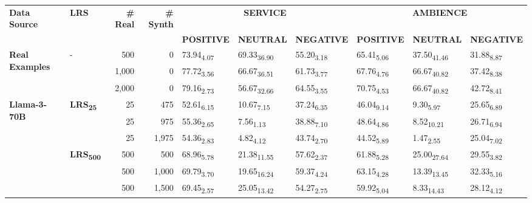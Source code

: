 \begin{table}[H]
\begin{subtable}{\linewidth}
{\begin{tabular}{llrrllllll}
\hline
\textbf{Data Source} & \textbf{LRS} & \textbf{\# Real} & \textbf{\# Synth} & \multicolumn{3}{c}{\textbf{SERVICE}} & \multicolumn{3}{c}{\textbf{AMBIENCE}}                        \\
                     &              &                 &                  & \textbf{POSITIVE}             & \textbf{NEUTRAL}            & \textbf{NEGATIVE}            & \textbf{POSITIVE} & \textbf{NEUTRAL} & \textbf{NEGATIVE} \\ \hline
\multirow{3}{*}{\textbf{Real Examples}} & \multirow{3}{*}{-} & 500 & 0 & 73.94\textsubscript{4.07} & 69.33\textsubscript{36.90} & 55.20\textsubscript{3.18} & 65.41\textsubscript{5.06} & 37.50\textsubscript{41.46} & 31.88\textsubscript{8.87} \\
 &  & 1,000 & 0 & 77.72\textsubscript{3.56} & 66.67\textsubscript{36.51} & 61.73\textsubscript{3.77} & 67.76\textsubscript{4.76} & 66.67\textsubscript{40.82} & 37.42\textsubscript{8.38} \\
 &  & 2,000 & 0 & 79.16\textsubscript{2.73} & 56.67\textsubscript{32.66} & 64.55\textsubscript{3.55} & 70.75\textsubscript{4.53} & 66.67\textsubscript{40.82} & 42.72\textsubscript{8.41} \\
\hline
\multirow{6}{*}{\textbf{Llama-3-70B}} & \multirow{3}{*}{\textbf{LRS\textsubscript{25}}} & 25 & 475 & 52.61\textsubscript{6.15} & 10.67\textsubscript{7.15} & 37.24\textsubscript{6.35} & 46.04\textsubscript{9.14} & 9.30\textsubscript{5.97} & 25.65\textsubscript{6.89} \\
 &  & 25 & 975 & 55.36\textsubscript{2.65} & 7.56\textsubscript{1.13} & 38.88\textsubscript{7.10} & 48.64\textsubscript{4.86} & 8.52\textsubscript{10.21} & 26.71\textsubscript{6.94} \\
 &  & 25 & 1,975 & 54.36\textsubscript{2.83} & 4.82\textsubscript{4.12} & 43.74\textsubscript{2.70} & 44.52\textsubscript{5.89} & 1.47\textsubscript{2.55} & 25.04\textsubscript{7.02} \\
\arrayrulecolor{gray}\cline{2-10}\arrayrulecolor{black}
 & \multirow{3}{*}{\textbf{LRS\textsubscript{500}}} & 500 & 500 & 68.96\textsubscript{5.78} & 21.38\textsubscript{11.55} & 57.62\textsubscript{2.37} & 61.88\textsubscript{5.28} & 25.00\textsubscript{27.64} & 29.55\textsubscript{3.82} \\
 &  & 500 & 1,000 & 69.79\textsubscript{3.70} & 19.65\textsubscript{16.24} & 59.37\textsubscript{4.24} & 63.15\textsubscript{4.28} & 13.39\textsubscript{13.45} & 32.33\textsubscript{5.16} \\
 &  & 500 & 1,500 & 69.45\textsubscript{2.57} & 25.05\textsubscript{13.42} & 54.27\textsubscript{2.75} & 59.92\textsubscript{5.04} & 8.33\textsubscript{14.43} & 28.12\textsubscript{4.12} \\

\end{tabular}}
\end{subtable}
\end{table}
